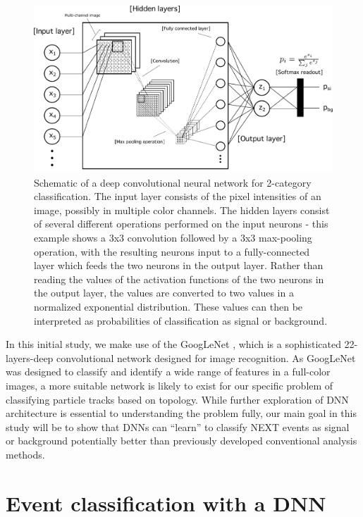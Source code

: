 \documentclass[a4paper,11pt]{article}
\begin{document}
\begin{figure}[!htb]
	\centering
	\includegraphics[scale = 0.6]{fig/general_nn.pdf}
	\caption{Schematic of a deep convolutional neural network for 2-category classification.  The input layer consists of the pixel intensities of an image, possibly in multiple color channels.  The 
		hidden layers consist of several different operations performed on the input neurons - this example shows a 3x3 convolution followed by a 3x3 max-pooling operation, with the resulting 
		neurons input to a fully-connected layer which feeds the two neurons in the output layer.  Rather than reading the values of the activation functions of
		the two neurons in the output layer, the values are converted to two values in a normalized exponential distribution.  These values can then be interpreted as probabilities of classification as
		signal or background.} \label{fig.generalnn}
\end{figure}

In this initial study, we make use of the GoogLeNet \cite{Googlenet}, which is a sophisticated 22-layers-deep convolutional network designed for image recognition.  As GoogLeNet was
designed to classify and identify a wide range of features in a full-color images, a more suitable network is likely to exist for our specific problem of classifying particle tracks based on
topology.  While further exploration of DNN architecture is essential to understanding the problem fully, our main goal in this study will be to show that DNNs can ``learn'' to classify 
NEXT events as signal or background potentially better than previously developed conventional analysis methods.

\section{Event classification with a DNN}
\end{document}
